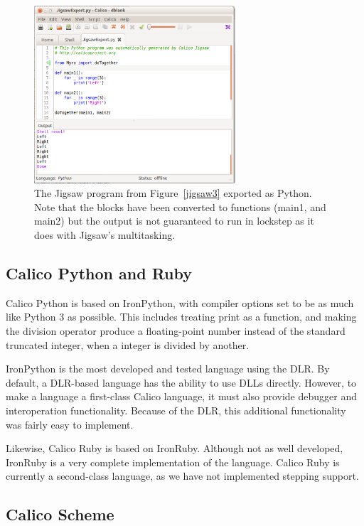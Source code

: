 \documentclass[preprint]{sigplanconf}
\begin{document}
\begin{figure}[h!]
  \centering
    \includegraphics[width=75mm]{jigsaw4.eps} 
  \caption{The Jigsaw program from Figure~\ref{jigsaw3} exported
    as Python. Note that the blocks have been converted to functions
    (main1, and main2) but the output is not guaranteed to run in
    lockstep as it does with Jigsaw's multitasking.}
  \label{jigsaw4}
\end{figure}

\subsection{Calico Python and Ruby}

Calico Python is based on IronPython, with compiler options set to be
as much like Python 3 as possible. This includes treating print as a
function, and making the division operator produce a floating-point
number instead of the standard truncated integer, when a integer is
divided by another.

IronPython is the most developed and tested language using the DLR.
By default, a DLR-based language has the ability to use DLLs
directly. However, to make a language a first-class Calico language,
it must also provide debugger and interoperation
functionality. Because of the DLR, this additional functionality was
fairly easy to implement.

Likewise, Calico Ruby is based on IronRuby. Although not as well
developed, IronRuby is a very complete implementation of the
language. Calico Ruby is currently a second-class language, as we have
not implemented stepping support.

\subsection{Calico Scheme}
\end{document}
